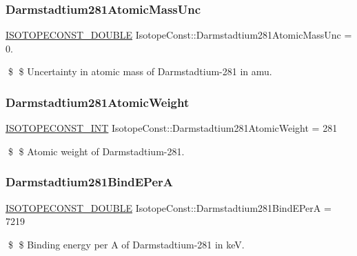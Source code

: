 \subsubsection{\texorpdfstring{Darmstadtium281\+Atomic\+Mass\+Unc}{Darmstadtium281AtomicMassUnc}}
{\footnotesize\ttfamily \mbox{\hyperlink{group___isotope_const-_macros_ga8f45a7272ce02c0b4c65c44636ed719a}{I\+S\+O\+T\+O\+P\+E\+C\+O\+N\+S\+T\+\_\+\+D\+O\+U\+B\+LE}} Isotope\+Const\+::\+Darmstadtium281\+Atomic\+Mass\+Unc = 0.}

\$ \$ Uncertainty in atomic mass of Darmstadtium-\/281 in amu. \mbox{\label{group___isotope_const-_darmstadtium-_ds281_ga7bf0ff8a23343e51403e9a6d84407091}} 
\subsubsection{\texorpdfstring{Darmstadtium281\+Atomic\+Weight}{Darmstadtium281AtomicWeight}}
{\footnotesize\ttfamily \mbox{\hyperlink{group___isotope_const-_macros_ga5f18360b3e99483a35c32d789e62621c}{I\+S\+O\+T\+O\+P\+E\+C\+O\+N\+S\+T\+\_\+\+I\+NT}} Isotope\+Const\+::\+Darmstadtium281\+Atomic\+Weight = 281}

\$ \$ Atomic weight of Darmstadtium-\/281. \mbox{\label{group___isotope_const-_darmstadtium-_ds281_ga57c8f7b93fb9655d45f5fedbf23d37fb}} 
\subsubsection{\texorpdfstring{Darmstadtium281\+Bind\+E\+PerA}{Darmstadtium281BindEPerA}}
{\footnotesize\ttfamily \mbox{\hyperlink{group___isotope_const-_macros_ga8f45a7272ce02c0b4c65c44636ed719a}{I\+S\+O\+T\+O\+P\+E\+C\+O\+N\+S\+T\+\_\+\+D\+O\+U\+B\+LE}} Isotope\+Const\+::\+Darmstadtium281\+Bind\+E\+PerA = 7219}

\$ \$ Binding energy per A of Darmstadtium-\/281 in keV. \mbox{\label{group___isotope_const-_darmstadtium-_ds281_ga7526f07544d2e3ec93b97280b220dbff}} 
